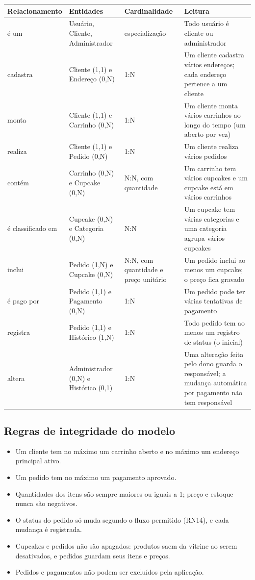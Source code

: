 \documentclass[12pt]{article}
\begin{document}
\small
\begin{longtable}{|p{3.1cm}|p{3.6cm}|p{2.5cm}|p{4.4cm}|}
\hline
\rowcolor{gray!30} \textbf{Relacionamento} & \textbf{Entidades} & \textbf{Cardinalidade} & \textbf{Leitura} \\ \hline
\endhead
é um & Usuário, Cliente, Administrador & especialização & Todo usuário é cliente ou administrador \\ \hline
cadastra & Cliente (1,1) e Endereço (0,N) & 1:N & Um cliente cadastra vários endereços; cada endereço pertence a um cliente \\ \hline
monta & Cliente (1,1) e Carrinho (0,N) & 1:N & Um cliente monta vários carrinhos ao longo do tempo (um aberto por vez) \\ \hline
realiza & Cliente (1,1) e Pedido (0,N) & 1:N & Um cliente realiza vários pedidos \\ \hline
contém & Carrinho (0,N) e Cupcake (0,N) & N:N, com quantidade & Um carrinho tem vários cupcakes e um cupcake está em vários carrinhos \\ \hline
é classificado em & Cupcake (0,N) e Categoria (0,N) & N:N & Um cupcake tem várias categorias e uma categoria agrupa vários cupcakes \\ \hline
inclui & Pedido (1,N) e Cupcake (0,N) & N:N, com quantidade e preço unitário & Um pedido inclui ao menos um cupcake; o preço fica gravado \\ \hline
é pago por & Pedido (1,1) e Pagamento (0,N) & 1:N & Um pedido pode ter várias tentativas de pagamento \\ \hline
registra & Pedido (1,1) e Histórico (1,N) & 1:N & Todo pedido tem ao menos um registro de status (o inicial) \\ \hline
altera & Administrador (0,N) e Histórico (0,1) & 1:N & Uma alteração feita pelo dono guarda o responsável; a mudança automática por pagamento não tem responsável \\ \hline
\end{longtable}

\normalsize
\subsection{Regras de integridade do modelo}

\begin{itemize}
\item Um cliente tem no máximo um carrinho aberto e no máximo um endereço principal ativo.
\item Um pedido tem no máximo um pagamento aprovado.
\item Quantidades dos itens são sempre maiores ou iguais a 1; preço e estoque nunca são negativos.
\item O status do pedido só muda segundo o fluxo permitido (RN14), e cada mudança é registrada.
\item Cupcakes e pedidos não são apagados: produtos saem da vitrine ao serem desativados, e pedidos guardam seus itens e preços.
\item Pedidos e pagamentos não podem ser excluídos pela aplicação.
\end{itemize}
\end{document}
